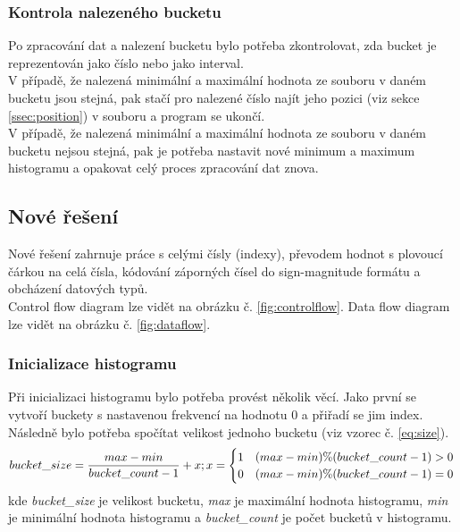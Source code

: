 \documentclass[12pt, a4paper]{article}
\begin{document}
\subsubsection{Kontrola nalezeného bucketu}
Po zpracování dat a nalezení bucketu bylo potřeba zkontrolovat, zda bucket je reprezentován jako číslo nebo jako interval. \\
\indent V případě, že nalezená minimální a maximální hodnota ze souboru v daném bucketu jsou stejná, pak stačí pro nalezené číslo najít jeho pozici (viz sekce \ref{ssec:position}) v souboru a program se ukončí. \\
\indent V případě, že nalezená minimální a maximální hodnota ze souboru v daném bucketu nejsou stejná, pak je potřeba nastavit nové minimum a maximum histogramu a opakovat celý proces zpracování dat znova.

\subsection{Nové řešení}
Nové řešení zahrnuje práce s celými čísly (indexy), převodem hodnot s plovoucí čárkou na celá čísla, kódování záporných čísel do sign-magnitude formátu a obcházení datových typů.\\
\indent Control flow diagram lze vidět na obrázku č. \ref{fig:controlflow}. Data flow diagram lze vidět na obrázku č. \ref{fig:dataflow}.

\subsubsection{Inicializace histogramu}
Při inicializaci histogramu bylo potřeba provést několik věcí. Jako první se vytvoří buckety s nastavenou frekvencí na hodnotu 0 a přiřadí se jim index. Následně bylo potřeba spočítat velikost jednoho bucketu (viz vzorec č. \ref{eq:size}).
\begin{equation}
bucket\_size =  \frac{max - min}{bucket\_count - 1} + x; x = 
\begin{cases}
1	&	(max - min) \% (bucket\_count - 1) > 0	\\
0	& 	(max - min) \% (bucket\_count - 1) = 0
\end{cases} \\
\label{eq:size} 
\end{equation}
kde \textit{bucket\_size} je velikost bucketu, \textit{max} je maximální hodnota histogramu, \textit{min} je minimální hodnota histogramu a \textit{bucket\_count} je počet bucketů v histogramu.\\
\end{document}

